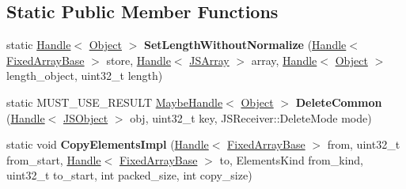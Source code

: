 \subsection*{Static Public Member Functions}
\begin{DoxyCompactItemize}
\item 
\hypertarget{classv8_1_1internal_1_1_dictionary_elements_accessor_a3508fe9aa67980b8bcce804f64645b59}{}static \hyperlink{classv8_1_1internal_1_1_handle}{Handle}$<$ \hyperlink{classv8_1_1internal_1_1_object}{Object} $>$ {\bfseries Set\+Length\+Without\+Normalize} (\hyperlink{classv8_1_1internal_1_1_handle}{Handle}$<$ \hyperlink{classv8_1_1internal_1_1_fixed_array_base}{Fixed\+Array\+Base} $>$ store, \hyperlink{classv8_1_1internal_1_1_handle}{Handle}$<$ \hyperlink{classv8_1_1internal_1_1_j_s_array}{J\+S\+Array} $>$ array, \hyperlink{classv8_1_1internal_1_1_handle}{Handle}$<$ \hyperlink{classv8_1_1internal_1_1_object}{Object} $>$ length\+\_\+object, uint32\+\_\+t length)\label{classv8_1_1internal_1_1_dictionary_elements_accessor_a3508fe9aa67980b8bcce804f64645b59}

\item 
\hypertarget{classv8_1_1internal_1_1_dictionary_elements_accessor_a24b792eba0d6e9057de7faebf2be9c65}{}static M\+U\+S\+T\+\_\+\+U\+S\+E\+\_\+\+R\+E\+S\+U\+L\+T \hyperlink{classv8_1_1internal_1_1_maybe_handle}{Maybe\+Handle}$<$ \hyperlink{classv8_1_1internal_1_1_object}{Object} $>$ {\bfseries Delete\+Common} (\hyperlink{classv8_1_1internal_1_1_handle}{Handle}$<$ \hyperlink{classv8_1_1internal_1_1_j_s_object}{J\+S\+Object} $>$ obj, uint32\+\_\+t key, J\+S\+Receiver\+::\+Delete\+Mode mode)\label{classv8_1_1internal_1_1_dictionary_elements_accessor_a24b792eba0d6e9057de7faebf2be9c65}

\item 
\hypertarget{classv8_1_1internal_1_1_dictionary_elements_accessor_ac19fe956a3f279e81d467fc0af48edaf}{}static void {\bfseries Copy\+Elements\+Impl} (\hyperlink{classv8_1_1internal_1_1_handle}{Handle}$<$ \hyperlink{classv8_1_1internal_1_1_fixed_array_base}{Fixed\+Array\+Base} $>$ from, uint32\+\_\+t from\+\_\+start, \hyperlink{classv8_1_1internal_1_1_handle}{Handle}$<$ \hyperlink{classv8_1_1internal_1_1_fixed_array_base}{Fixed\+Array\+Base} $>$ to, Elements\+Kind from\+\_\+kind, uint32\+\_\+t to\+\_\+start, int packed\+\_\+size, int copy\+\_\+size)\label{classv8_1_1internal_1_1_dictionary_elements_accessor_ac19fe956a3f279e81d467fc0af48edaf}

\end{DoxyCompactItemize}
